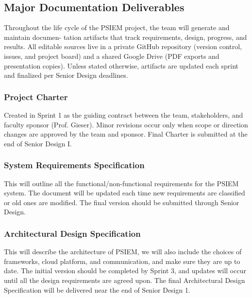 
\subsection{Major Documentation Deliverables}
Throughout the life cycle of the PSIEM project, the team will generate and maintain documen-
tation artifacts that track requirements, design, progress, and results. All editable sources live in a
private GitHub repository (version control, issues, and project board) and a shared Google Drive
(PDF exports and presentation copies). Unless stated otherwise, artifacts are updated each sprint
and finalized per Senior Design deadlines.

\subsubsection{Project Charter}
Created in Sprint 1 as the guiding contract between the team, stakeholders, and faculty sponsor
(Prof. Gieser). Minor revisions occur only when scope or direction changes are approved by the
team and sponsor. Final Charter is submitted at the end of Senior Design I.

\subsubsection{System Requirements Specification}
This will outline all the functional/non-functional requirements for the PSIEM system. The document will be updated each time new requirements are classified or old ones are modified. The final version should be submitted through Senior Design.

\subsubsection{Architectural Design Specification}
This will describe the architecture of PSIEM, we will also include the choices of frameworks, cloud platform, and communication, and make sure they are up to date. The initial version should be completed by Sprint 3, and updates will occur until all the design requirements are agreed upon. The final Architectural Design Specification will be delivered near the end of Senior Design 1.

